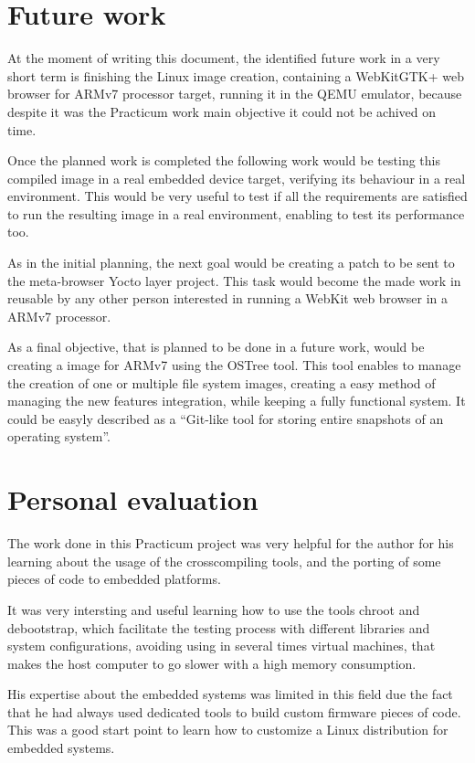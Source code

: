 \documentclass[a4paper,11pt,openany]{report}
\begin{document}
\chapter{Future work}
At the moment of writing this document, the identified future work in a very short term is finishing the Linux image creation, containing a WebKitGTK+ web browser for ARMv7 processor target, running it in the QEMU emulator, because despite it was the Practicum work main objective it could not be achived on time.

Once the planned work is completed the following work would be testing this compiled image in a real embedded device target, verifying its behaviour in a real environment. This would be very useful to test if all the requirements are satisfied to run the resulting image in a real environment, enabling to test its performance too.

As in the initial planning, the next goal would be creating a patch to be sent to the meta-browser Yocto layer project. This task would become the made work in reusable by any other person interested in running a WebKit web browser in a ARMv7 processor.

As a final objective, that is planned to be done in a future work, would be creating a image for ARMv7 using the OSTree\cite{ostree} tool. This tool enables to manage the creation of one or multiple file system images, creating a easy method of managing the new features integration, while keeping a fully functional system. It could be easyly described as a ``Git-like tool for storing entire snapshots of an operating system''.

\chapter{Personal evaluation}
The work done in this Practicum project was very helpful for the author for his learning about the usage of the crosscompiling tools, and the porting of some pieces of code to embedded platforms.

It was very intersting and useful learning how to use the tools chroot and debootstrap, which facilitate the testing process with different libraries and system configurations, avoiding using in several times virtual machines, that makes the host computer to go slower with a high memory consumption.

His expertise about the embedded systems was limited in this field due the fact that he had always used dedicated tools to build custom firmware pieces of code. This was a good start point to learn how to customize a Linux distribution for embedded systems.
\end{document}
